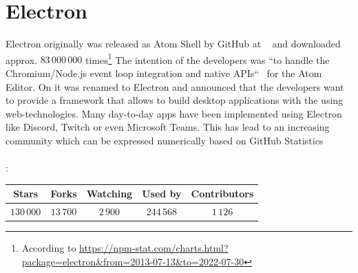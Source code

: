 \section{Electron}
\label{sec:electron}
Electron originally was released as Atom Shell by GitHub at ~\cite{githubReleaseV010} and downloaded approx. $83\,000\,000$ times\footnote{According to \url{https://npm-stat.com/charts.html?package=electron&from=2013-07-13&to=2022-07-30}}
The intention of the developers was ``to handle the Chromium/Node.js event loop integration and native APIs``~\cite{sawicki_2015} for the Atom Editor.
On  it was renamed to Electron and announced that the developers want to provide a framework that allows to build desktop applications with the using web-technologies.
Many day-to-day apps have been implemented using Electron like Discord, Twitch or even Microsoft Teams.
This has lead to an increasing community which can be expressed numerically based on GitHub Statistics~\cite{GithubElectron} \\ \\:
\begin{tabular} {| c | c | c | c | c |}
    \label{tab:electron:statistics}
    Stars      & Forks     & Watching & Used by    & Contributors \\ \hline
    $130\,000$ & $13\,700$ & $2\,900$ & $244\,568$ & $1\,126$
\end{tabular}

